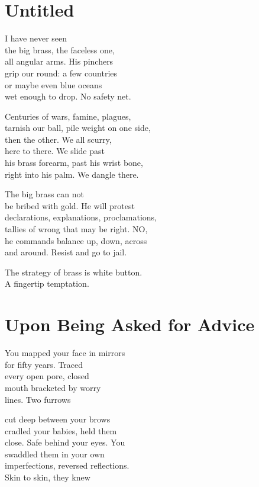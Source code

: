 \documentclass[twoside,10pt]{book}
\begin{document}
\clearpage
\section{Untitled}

I have never seen\\
the big brass, the faceless one,\\
all angular arms. His pinchers\\
grip our round: a few countries\\
or maybe even blue oceans\\
wet enough to drop. No safety net.

Centuries of wars, famine, plagues,\\
tarnish our ball, pile weight on one side,\\
then the other. We all scurry,\\
here to there. We slide past\\
his brass forearm, past his wrist bone,\\
right into his palm. We dangle there.

The big brass can not\\
be bribed with gold. He will protest\\
declarations, explanations, proclamations,\\
tallies of wrong that may be right. NO,\\
he commands balance up, down, across\\
and around. Resist and go to jail.

The strategy of brass is white button.\\
A fingertip temptation.


\clearpage
\section{Upon Being Asked for Advice}

You mapped your face in mirrors\\
for fifty years. Traced\\
every open pore, closed\\
mouth bracketed by worry\\
lines. Two furrows

cut deep between your brows\\
cradled your babies, held them\\
close. Safe behind your eyes. You\\
swaddled them in your own\\
imperfections, reversed reflections.\\
Skin to skin, they knew
\end{document}
